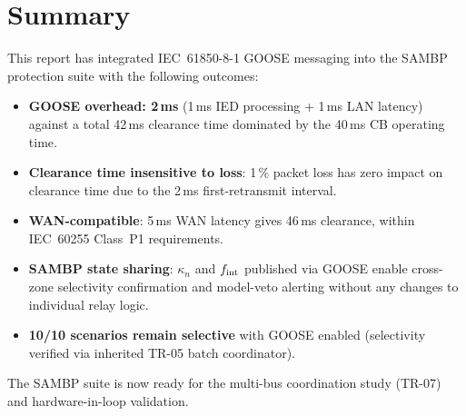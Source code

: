 \documentclass[12pt,a4paper]{article}
\newcommand{\kn}{\kappa_n}
\newcommand{\fint}{f_{\rm int}}
\begin{document}
\section{Summary}

This report has integrated IEC~61850-8-1 GOOSE messaging into the SAMBP
protection suite with the following outcomes:

\begin{itemize}
  \item \textbf{GOOSE overhead: 2\,ms} (1\,ms IED processing + 1\,ms
    LAN latency) against a total 42\,ms clearance time dominated by
    the 40\,ms CB operating time.

  \item \textbf{Clearance time insensitive to loss}: 1\,\% packet loss
    has zero impact on clearance time due to the 2\,ms first-retransmit
    interval.

  \item \textbf{WAN-compatible}: 5\,ms WAN latency gives 46\,ms
    clearance, within IEC~60255 Class~P1 requirements.

  \item \textbf{SAMBP state sharing}: $\kn$ and $\fint$ published via
    GOOSE enable cross-zone selectivity confirmation and model-veto
    alerting without any changes to individual relay logic.

  \item \textbf{10/10 scenarios remain selective} with GOOSE enabled
    (selectivity verified via inherited TR-05 batch coordinator).
\end{itemize}

\noindent
The SAMBP suite is now ready for the multi-bus coordination study
(TR-07) and hardware-in-loop validation.



\end{document}
